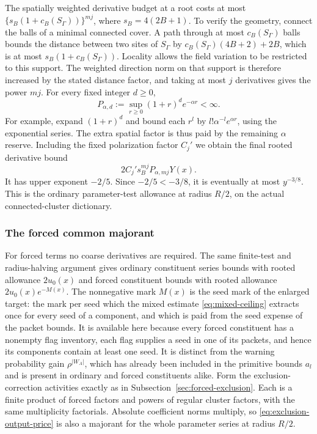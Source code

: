 The spatially weighted derivative budget at a root costs at most
$\{s_B(1+c_B(S_\Gamma))\}^{mj}$, where
$s_B=4(2B+1)$. To verify the geometry, connect the balls of a
minimal connected cover. A path through at most $c_B(S_\Gamma)$
balls bounds the distance between two sites of $S_\Gamma$ by
$c_B(S_\Gamma)(4B+2)+2B$, which is at most
$s_B(1+c_B(S_\Gamma))$. Locality allows the field variation to
be restricted to this support. The weighted direction norm on
that support is therefore increased by the stated distance
factor, and taking at most $j$ derivatives gives the power $mj$.
For every fixed integer $d\ge0$,
\[
       P_{\alpha,d}:=\sup_{r\ge0}(1+r)^d e^{-\alpha r}<\infty.
\]
For example, expand $(1+r)^d$ and bound each $r^l$ by
$l!\alpha^{-l}e^{\alpha r}$, using the exponential series.
The extra spatial factor is thus paid by the remaining
$\alpha$ reserve. Including the fixed polarization factor $C_j'$
we obtain the final rooted derivative bound
\begin{equation}\label{eq:sector-ordinary-final}
                       2C_j's_B^{mj}P_{\alpha,mj}Y(x).
\end{equation}
It has upper exponent $-2/5$. Since $-2/5<-3/8$, it is eventually
at most $y^{-3/8}$. This is the ordinary parameter-test allowance
at radius $R/2$, on the actual connected-cluster dictionary.

\subsubsection{The forced common majorant}
For forced terms no coarse derivatives are required. The same
finite-test and radius-halving argument gives ordinary constituent
series bounds with rooted allowance $2u_0(x)$ and forced
constituent bounds with rooted allowance
$2u_0(x)e^{-M(x)}$. The nonnegative mark $M(x)$ is the seed mark of
the enlarged target: the mark per seed which the mixed estimate
\eqref{eq:mixed-ceiling} extracts once for every seed of a
component, and which is paid from the seed expense of the packet
bounds. It is available here because every forced
constituent has a nonempty flag inventory, each flag supplies a
seed in one of its packets, and hence its components contain at
least one seed. It is distinct from the warning probability gain
$\rho^{|W_A|}$, which has already been included in the primitive
bounds $a_l$ and is present in ordinary and forced constituents
alike. Form the exclusion-correction activities exactly as
in Subsection~\ref{sec:forced-exclusion}. Each is a finite product
of forced factors and powers of regular cluster factors, with the
same multiplicity factorials. Absolute coefficient norms multiply,
so \eqref{eq:exclusion-output-price} is also a majorant for the
whole parameter series at radius $R/2$.

